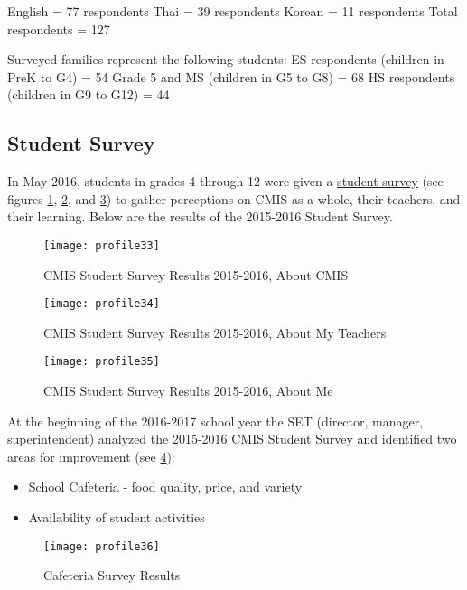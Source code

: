 \begin{table}[H]
English = 77 respondents
Thai = 39 respondents
Korean = 11 respondents
Total respondents = 127

Surveyed families represent the following students: 
ES respondents (children in PreK to G4) = 54
Grade 5 and MS (children in G5 to G8) = 68
HS respondents (children in G9 to G12) = 44
\end{table}


\subsection{Student Survey}

In May 2016, students in grades 4 through 12 were given a \href{https://docs.google.com/a/cmis.ac.th/forms/d/1n7vFCQbPQmF6pEPJKPBsu4rzdiW4KQ_DrBcjTMUbLH4/viewanalytics}{student survey} (see figures \ref{figure:studentsurveycmis}, \ref{figure:studentsurveyteachers}, and \ref{figure:studentsurveyme}) to gather perceptions on CMIS as a whole, their teachers, and their learning.  Below are the results of the 2015-2016 Student Survey.  

\begin{figure}[H]
\centering
\caption{CMIS Student Survey Results 2015-2016, About CMIS}
\label{figure:studentsurveycmis}
\texttt{[image: profile33]}
\end{figure}

\begin{figure}[H]
\centering
\caption{CMIS Student Survey Results 2015-2016, About My Teachers}
\label{figure:studentsurveyteachers}
\texttt{[image: profile34]}
\end{figure}

\begin{figure}[H]
\centering
\caption{CMIS Student Survey Results 2015-2016, About Me}
\label{figure:studentsurveyme}
\texttt{[image: profile35]}
\end{figure}

At the beginning of the 2016-2017 school year the SET (director, manager, superintendent) analyzed the 2015-2016 CMIS Student Survey and identified two areas for improvement (see \ref{figure:cafateriasurvey}):
\begin{itemize}
\item School Cafeteria - food quality, price, and variety
\item Availability of student activities
\end{itemize}

\begin{figure}[H]
\centering
\caption{Cafeteria Survey Results}
\label{figure:cafateriasurvey}
\texttt{[image: profile36]}
\end{figure}

